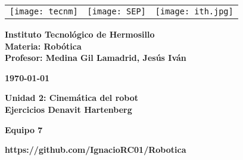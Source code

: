 \begin{titlepage}
	\centering
	\begin{tabular}{@{}p{} p{} p{}@{}}
		\texttt{[image: tecnm]} & 
		\centering \texttt{[image: SEP]} & 
		\raggedleft \texttt{[image: ith.jpg]} \\
	\end{tabular}
	
	\vspace{2em}
	
	\noindent
	\begin{minipage}[t]{0.48\textwidth}
		\raggedright
		\small \textbf{%
			Instituto Tecnológico de Hermosillo\\
			Materia: Robótica\\
			Profesor: Medina Gil Lamadrid, Jesús Iván%
		}
	\end{minipage}%
	\hfill
	\begin{minipage}[t]{0.48\textwidth}
		\raggedleft
		\small \textbf{\today}
	\end{minipage}
	
	\vspace{2em}
	
	{\large \textbf{Unidad 2: Cinemática del robot}}\\
	{\Huge \textbf{Ejercicios Denavit Hartenberg}}
		
	\vspace{1em}
	
	\begin{center}
		{\Large \textbf{Equipo 7}}
		
	\textbf{https://github.com/IgnacioRC01/Robotica}
	\end{center}
	
	\vspace{1em}
	

\end{titlepage}
